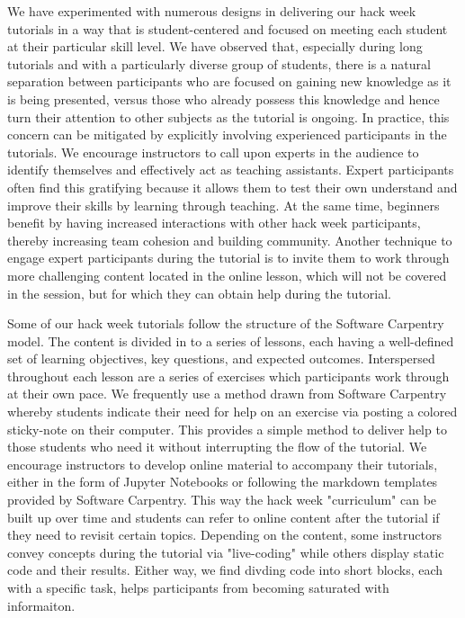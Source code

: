 \documentclass{nature}
\begin{document}
We have experimented with numerous designs in delivering our hack week tutorials in a way that is student-centered and focused on meeting each student at their particular skill level. We have observed that, especially during long tutorials and with a particularly diverse group of students, there is a natural separation between participants who are focused on gaining new knowledge as it is being presented, versus those who already possess this knowledge and hence turn their attention to other subjects as the tutorial is ongoing. In practice, this concern can be mitigated by explicitly involving experienced participants in the tutorials. We encourage instructors to call upon experts in the audience to identify themselves and effectively act as teaching assistants. Expert participants often find this gratifying because it allows them to test their own understand and improve their skills by learning through teaching. At the same time, beginners benefit by having increased interactions with other hack week participants, thereby increasing team cohesion and building community. Another technique to engage expert participants during the tutorial is to invite them to work through more challenging content located in the online lesson, which will not be covered in the session, but for which they can obtain help during the tutorial.

Some of our hack week tutorials follow the structure of the Software Carpentry model. The content is divided in to a series of lessons, each having a well-defined set of learning objectives, key questions, and expected outcomes. Interspersed throughout each lesson are a series of exercises which participants work through at their own pace. We frequently use a method drawn from Software Carpentry whereby students indicate their need for help on an exercise via posting a colored sticky-note on their computer. This provides a simple method to deliver help to those students who need it without interrupting the flow of the tutorial. We encourage instructors to develop online material to accompany their tutorials, either in the form of Jupyter Notebooks or following the markdown templates provided by Software Carpentry. This way the hack week "curriculum" can be built up over time and students can refer to online content after the tutorial if they need to revisit certain topics. Depending on the content, some instructors convey concepts during the tutorial via "live-coding" while others display static code and their results. Either way, we find divding code into short blocks, each with a specific task, helps participants from becoming saturated with informaiton.
\end{document}
